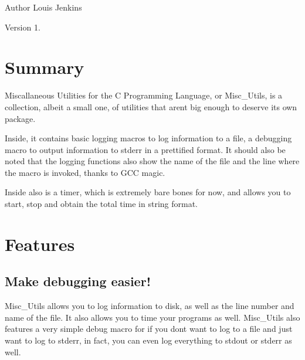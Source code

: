 \begin{DoxyAuthor}{Author}
Louis Jenkins 
\end{DoxyAuthor}
\begin{DoxyVersion}{Version}
1.
\end{DoxyVersion}
\hypertarget{index_list_summary}{}\section{Summary}\label{index_list_summary}
Miscallaneous Utilities for the C Programming Language, or Misc\+\_\+\+Utils, is a collection, albeit a small one, of utilities that aren\textquotesingle{}t big enough to deserve it\textquotesingle{}s own package.

Inside, it contains basic logging macros to log information to a file, a debugging macro to output information to stderr in a prettified format. It should also be noted that the logging functions also show the name of the file and the line where the macro is invoked, thanks to G\+C\+C magic.

Inside also is a timer, which is extremely bare bones for now, and allows you to start, stop and obtain the total time in string format.\hypertarget{index_list_features}{}\section{Features}\label{index_list_features}
\hypertarget{index_log}{}\subsection{Make debugging easier!}\label{index_log}
Misc\+\_\+\+Utils allows you to log information to disk, as well as the line number and name of the file. It also allows you to time your programs as well. Misc\+\_\+\+Utils also features a very simple debug macro for if you don\textquotesingle{}t want to log to a file and just want to log to stderr, in fact, you can even log everything to stdout or stderr as well. 